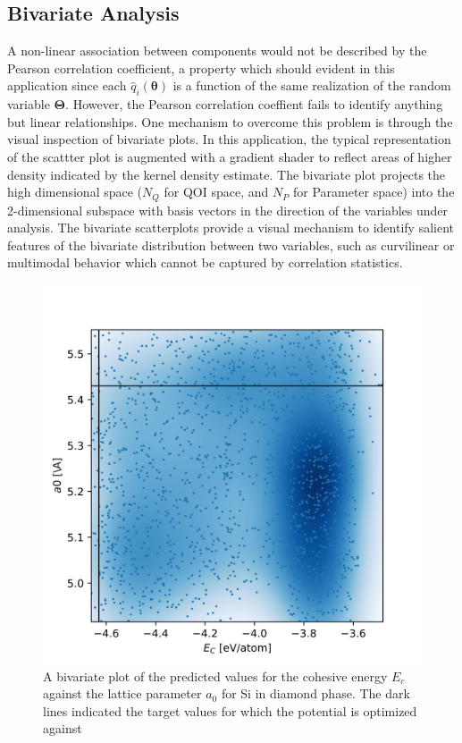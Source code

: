 \subsection{Bivariate Analysis}

A non-linear association between components would not be described by the Pearson correlation coefficient, a property which should evident in this application since each $\hat{q}_i(\bm{\theta})$ is a function of the same realization of the random variable $\bm{\Theta}$.  However, the Pearson correlation coeffient fails to identify anything but linear relationships.  One mechanism to overcome this problem is through the visual inspection of bivariate plots.  In this application, the typical representation of the scattter plot is augmented with a gradient shader to reflect areas of higher density indicated by the kernel density estimate.  The bivariate plot projects the high dimensional space ($N_Q$ for QOI space, and $N_P$ for Parameter space) into the 2-dimensional subspace with basis vectors in the direction of the variables under analysis.  The bivariate scatterplots provide a visual mechanism to identify salient features of the bivariate distribution between two variables, such as curvilinear or multimodal behavior which cannot be captured by correlation statistics.

\begin{figure}[ht]
  \centering
  \includegraphics[width=5in]{chapter8/qoi_2d_density_plots/Si_dia_E_coh__Si_dia_a0}
  \caption{A bivariate plot of the predicted values for the cohesive energy $E_c$ against the lattice parameter $a_0$ for Si in diamond phase.  The dark lines indicated the target values for which the potential is optimized against}
  \label{fig:Si_Ec_a0_scatterplot}
\end{figure}

